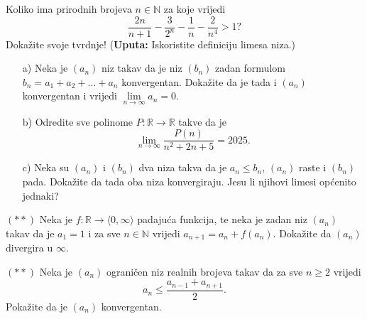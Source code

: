 \begin{exercise}
Koliko ima prirodnih brojeva $n\in \mathbb{N}$ za koje vrijedi
$$\dfrac{2n}{n+1}-\dfrac{3}{2^n}-\dfrac{1}{n}-\dfrac{2}{n^4}>1?$$
Dokažite svoje tvrdnje! (\textbf{Uputa:} Iskoristite definiciju limesa niza.)
\end{exercise}
\begin{exercise} \textbf{}
\begin{itemize}
\item[a)] Neka je $(a_n)$ niz takav da je niz $(b_n)$ zadan formulom $b_n=a_1+a_2+\dots+a_n$ konvergentan. Dokažite da je tada i $(a_n)$ konvergentan i vrijedi $\lim\limits_{n\to \infty}{a_n}=0$.
\item[b)] Odredite sve polinome $P : \mathbb{R}\to \mathbb{R}$ takve da je
$$\lim\limits_{n\to\infty}{\dfrac{P(n)}{n^2+2n+5}}=2025.$$
\item[c)] Neka su $(a_n)$ i $(b_n)$ dva niza takva da je $a_n\leq b_n$, $(a_n)$ raste i $(b_n)$ pada. Dokažite da tada oba niza konvergiraju. Jesu li njihovi limesi općenito jednaki?
\end{itemize}
\end{exercise}
\begin{exercise} $(**)$
Neka je $f : \mathbb{R}\to \langle 0, \infty\rangle$ padajuća funkcija, te neka je zadan niz $(a_n)$ takav da je $a_1=1$ i za sve $n\in \mathbb{N}$ vrijedi $a_{n+1}=a_n+f(a_n)$. Dokažite da $(a_n)$ divergira u $\infty$.
\end{exercise}
\begin{exercise} $(**)$
Neka je $(a_n)$ ograničen niz realnih brojeva takav da za sve $n\geq 2$ vrijedi
$$a_n\leq \dfrac{a_{n-1}+a_{n+1}}{2}.$$
Pokažite da je $(a_n)$ konvergentan.
\end{exercise}
